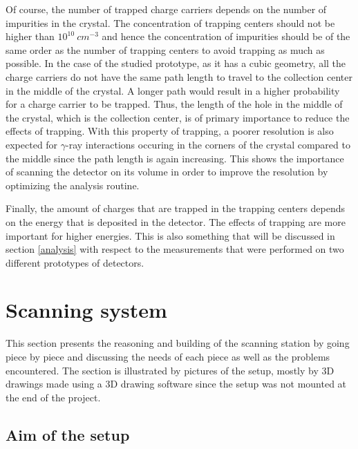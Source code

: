 \documentclass[11pt,a4paper]{article}
\begin{document}
Of course, the number of trapped charge carriers depends on the number of impurities in the crystal. The concentration of trapping centers should not be higher than $10^{10}~cm^{-3}$ \cite{ortec} and hence the concentration of impurities should be of the same order as the number of trapping centers to avoid trapping as much as possible. In the case of the studied prototype, as it has a cubic geometry, all the charge carriers do not have the same path length to travel to the collection center in the middle of the crystal. A longer path would result in a higher probability for a charge carrier to be trapped. Thus, the length of the hole in the middle of the crystal, which is the collection center, is of primary importance to reduce the effects of trapping. With this property of trapping, a poorer resolution is also expected for $\gamma$-ray interactions occuring in the corners of the crystal compared to the middle since the path length is again increasing. This shows the importance of scanning the detector on its volume in order to improve the resolution by optimizing the analysis routine.

Finally, the amount of charges that are trapped in the trapping centers depends on the energy that is deposited in the detector. The effects of trapping are more important for higher energies. This is also something that will be discussed in section \ref{analysis} with respect to the measurements that were performed on two different prototypes of detectors.

\newpage

\section{Scanning system} \label{scansystem}

This section presents the reasoning and building of the scanning station by going piece by piece and discussing the needs of each piece as well as the problems encountered. The section is illustrated by pictures of the setup, mostly by 3D drawings made using a 3D drawing software since the setup was not mounted at the end of the project.

\subsection{Aim of the setup}
\end{document}
